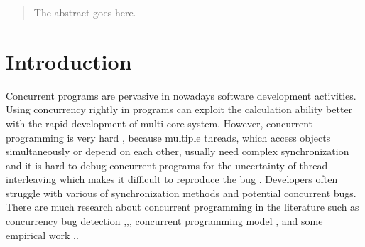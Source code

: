 \documentclass[conference]{IEEEtran}
\begin{document}




\maketitle

\begin{abstract}
The abstract goes here.
\end{abstract}





%
\IEEEpeerreviewmaketitle



\section{Introduction}
Concurrent programs are pervasive \cite{journals/jss/PintoTFFB15} in nowadays software development activities. Using concurrency rightly in programs can exploit the calculation ability better with the rapid development of multi-core system. However, concurrent programming is very hard \cite{journals/corr/McKenney17},\cite{journals/queue/SutterL05} because multiple threads, which access objects simultaneously or depend on each other, usually need complex synchronization and it is hard to debug concurrent programs for the uncertainty of thread interleaving which makes it difficult to reproduce the bug \cite{conf/asplos/LuPSZ08}. Developers often struggle with various of synchronization methods and potential concurrent bugs. There are much research about concurrent programming in the literature such as concurrency bug detection \cite{conf/pldi/FlanaganF09},\cite{conf/kbse/KroeningPSW16},\cite{conf/pldi/FlanaganFY08}, concurrent programming model \cite{conf/java/Lea00},\cite{conf/oopsla/Bagherzadeh15} and some empirical work \cite{conf/sosp/DavidGT13},\cite{conf/oopsla/PintoTC15}.
\end{document}

